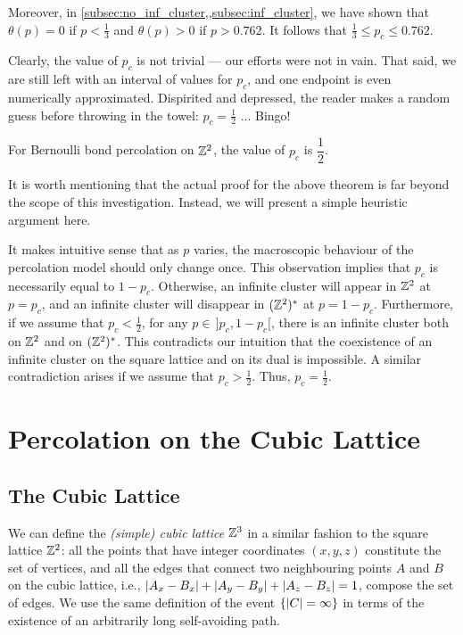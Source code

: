 \documentclass[a4paper, 12pt]{article}
\begin{document}
Moreover, in \cref{subsec:no_inf_cluster,,subsec:inf_cluster}, we have shown that $\theta(p) = 0$ if $p < \frac{1}{3}$ and $\theta(p) > 0$ if $p > 0.762$. It follows that $\frac{1}{3} \leq p_c \leq 0.762$. 

Clearly, the value of $p_c$ is not trivial --- our efforts were not in vain. That said, we are still left with an interval of values for $p_c$, and one endpoint is even numerically approximated. Dispirited and depressed, the reader makes a random guess before throwing in the towel: $p_c = \frac{1}{2}$ ... Bingo!

\begin{thm}\label{thm:pc_eq_one_half_kesten}
For Bernoulli bond percolation on $\mathbb{Z}^2$, the value of $p_c$ is  $\dfrac{1}{2}$.
\end{thm}

It is worth mentioning that the actual proof for the above theorem is far beyond the scope of this investigation. Instead, we will present a simple heuristic argument here.

\begin{hproof}
It makes intuitive sense that as $p$ varies, the macroscopic behaviour of the percolation model should only change once. This observation implies that $p_c$ is necessarily equal to $1 - p_c$. Otherwise, an infinite cluster will appear in $\mathbb{Z}^2$ at $p = p_c$, and an infinite cluster will disappear in $(\mathbb{Z}^2)^*$ at $p = 1 - p_c$. Furthermore, if we assume that $p_c < \frac{1}{2}$, for any $p \in\,]p_c, 1 - p_c[$, there is an infinite cluster both on $\mathbb{Z}^2$ and on $(\mathbb{Z}^2)^*$. This contradicts our intuition that the coexistence of an infinite cluster on the square lattice and on its dual is impossible. A similar contradiction arises if we assume that $p_c > \frac{1}{2}$. Thus, $p_c = \frac{1}{2}$.
\end{hproof}

\section{Percolation on the Cubic Lattice}
\subsection{The Cubic Lattice}
We can define the \textit{(simple) cubic lattice} $\mathbb{Z}^3$ in a similar fashion to the square lattice $\mathbb{Z}^2$: all the points that have integer coordinates $(x, y, z)$ constitute the set of vertices, and all the edges that connect two neighbouring points $A$ and $B$ on the cubic lattice, i.e., $\lvert A_x - B_x \rvert + \lvert A_y - B_y \rvert + \lvert A_z - B_z \rvert = 1$, compose the set of edges. We use the same definition of the event $\{\lvert C \rvert = \infty\}$ in terms of the existence of an arbitrarily long self-avoiding path.
\end{document}
